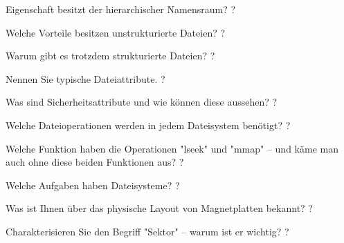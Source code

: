 \documentclass[avery5371]{flashcards}
\begin{document}
\begin{flashcard}[Dateisysteme]{Eigenschaft besitzt der hierarchischer Namensraum? }
    ?
\end{flashcard}

\begin{flashcard}[Dateisysteme]{Welche Vorteile besitzen unstrukturierte Dateien? }
    ?
\end{flashcard}

\begin{flashcard}[Dateisysteme]{Warum gibt es trotzdem strukturierte Dateien? }
    ?
\end{flashcard}

\begin{flashcard}[Dateisysteme]{Nennen Sie typische Dateiattribute. }
    ?
\end{flashcard}

\begin{flashcard}[Dateisysteme]{Was sind Sicherheitsattribute und wie können diese aussehen?}
    ?
\end{flashcard}

\begin{flashcard}[Dateisysteme]{Welche Dateioperationen werden in jedem Dateisystem benötigt?}
    ?
\end{flashcard}

\begin{flashcard}[Dateisysteme]{Welche Funktion haben die Operationen "lseek" und "mmap" – und käme man auch ohne diese beiden Funktionen aus?}
    ?
\end{flashcard}

\begin{flashcard}[Dateisysteme]{Welche Aufgaben haben Dateisysteme?}
    ?
\end{flashcard}

\begin{flashcard}[Dateisysteme]{Was ist Ihnen über das physische Layout von Magnetplatten bekannt?}
    ?
\end{flashcard}

\begin{flashcard}[Dateisysteme]{Charakterisieren Sie den Begriff "Sektor" – warum ist er wichtig?}
    ?
\end{flashcard}
\end{document}

